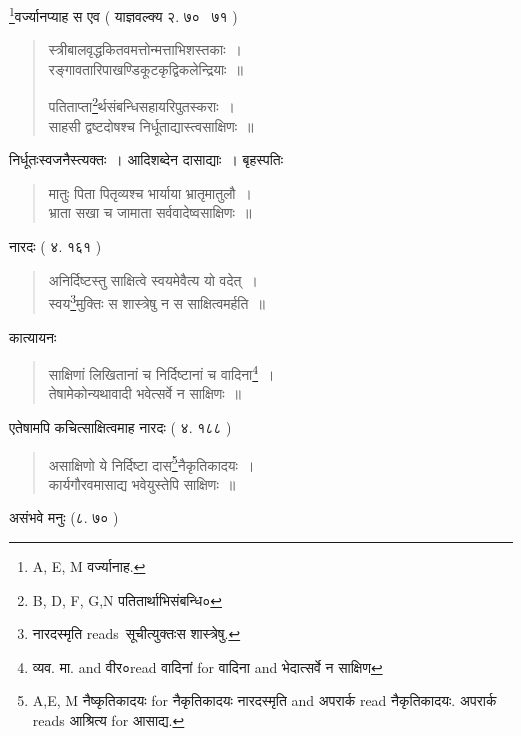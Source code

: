\documentclass[11pt, openany]{book}
\begin{document}
\renewcommand{\thefootnote}{5}\footnote{A, E, M वर्ज्यानाह.}वर्ज्यानप्याह स एव ( याज्ञवल्क्य २. ७० \textendash\ ७१ ) 

\begin{quote}
{\vy स्त्रीबालवृद्धकितवमत्तोन्मत्ताभिशस्तकाः~।\\
रङ्गावतारिपाखण्डिकूटकृद्विकलेन्द्रियाः~॥

पतिताप्ता\renewcommand{\thefootnote}{6}\footnote{B, D, F, G,N पतितार्थाभिसंबन्धि०}र्थसंबन्धिसहायरिपुतस्कराः~।\\
साहसी द्वष्टदोषश्च निर्धूताद्यास्त्वसाक्षिणः~॥}
\end{quote}

निर्धूतःस्वजनैस्त्यक्तः~। आदिशब्देन दासाद्याः~। बृहस्पतिः

\begin{quote}
{\vy मातुः पिता पितृव्यश्च भार्याया भ्रातृमातुलौ~।\\
भ्राता सखा च जामाता सर्ववादेष्वसाक्षिणः~॥}
\end{quote}

\newpage
{}

नारदः ( ४. १६१ )

\begin{quote}
{\vy अनिर्दिष्टस्तु साक्षित्वे स्वयमेवैत्य यो वदेत्~।\\
स्वय\renewcommand{\thefootnote}{1}\footnote{नारदस्मृति reads\textendash\ सूचीत्युक्तःस शास्त्रेषु.}मुक्तिः स शास्त्रेषु न स साक्षित्वमर्हति~॥}
\end{quote}

कात्यायनः

\begin{quote}
{\vy साक्षिणां लिखितानां च निर्दिष्टानां च वादिना\renewcommand{\thefootnote}{2}\footnote{व्यव. मा. and वीर०read वादिनां for वादिना and भेदात्सर्वे न साक्षिण}~।\\
तेषामेकोन्यथावादी भवेत्सर्वे न साक्षिणः~॥}
\end{quote}

एतेषामपि कचित्साक्षित्वमाह नारदः ( ४. १८८ ) 

\begin{quote}
{\vy असाक्षिणो ये निर्दिष्टा दास\renewcommand{\thefootnote}{3}\footnote{A,E, M नैष्कृतिकादयः for नैकृतिकादयः नारदस्मृति and अपरार्क read नैकृतिकादयः. अपरार्क reads आश्रित्य for आसाद्य.}नैकृतिकादयः~।\\
कार्यगौरवमासाद्य भवेयुस्तेपि साक्षिणः~॥}
\end{quote}

असंभवे मनुः (८. ७० ) 
\end{document}
